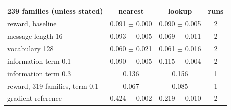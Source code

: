 \begin{tabular}{lccc}\toprule
239 families (unless stated) & nearest & lookup & runs \\ \midrule
reward, baseline & 0.091 $\pm$ 0.000 & 0.090 $\pm$ 0.005 & 2 \\
message length 16 & 0.093 $\pm$ 0.005 & 0.069 $\pm$ 0.011 & 2 \\
vocabulary 128 & 0.060 $\pm$ 0.021 & 0.061 $\pm$ 0.016 & 2 \\
information term 0.1 & 0.090 $\pm$ 0.005 & 0.115 $\pm$ 0.004 & 2 \\
information term 0.3 & 0.136 & 0.156 & 1 \\
reward, 319 families, term 0.1 & 0.067 & 0.085 & 1 \\
gradient reference & 0.424 $\pm$ 0.002 & 0.219 $\pm$ 0.010 & 2 \\
\bottomrule
\end{tabular}